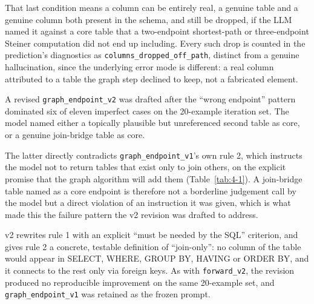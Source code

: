 That last condition means a column can be entirely real, a genuine table and a genuine column both present in the schema, and still be dropped, if the LLM named it against a core table that a two-endpoint shortest-path or three-endpoint Steiner computation did not end up including. Every such drop is counted in the prediction's diagnostics as \texttt{columns\_dropped\_off\_path}, distinct from a genuine hallucination, since the underlying error mode is different: a real column attributed to a table the graph step declined to keep, not a fabricated element.

A revised \texttt{graph\_endpoint\_v2} was drafted after the ``wrong endpoint'' pattern dominated six of eleven imperfect cases on the 20-example iteration set. The model named either a topically plausible but unreferenced second table as core, or a genuine join-bridge table as core.

The latter directly contradicts \texttt{graph\_endpoint\_v1}'s own rule 2, which instructs the model not to return tables that exist only to join others, on the explicit promise that the graph algorithm will add them (Table~\ref{tab:4-1}). A join-bridge table named as a core endpoint is therefore not a borderline judgement call by the model but a direct violation of an instruction it was given, which is what made this the failure pattern the v2 revision was drafted to address.

v2 rewrites rule 1 with an explicit ``must be needed by the SQL'' criterion, and gives rule 2 a concrete, testable definition of ``join-only'': no column of the table would appear in SELECT, WHERE, GROUP BY, HAVING or ORDER BY, and it connects to the rest only via foreign keys. As with \texttt{forward\_v2}, the revision produced no reproducible improvement on the same 20-example set, and \texttt{graph\_endpoint\_v1} was retained as the frozen prompt.

